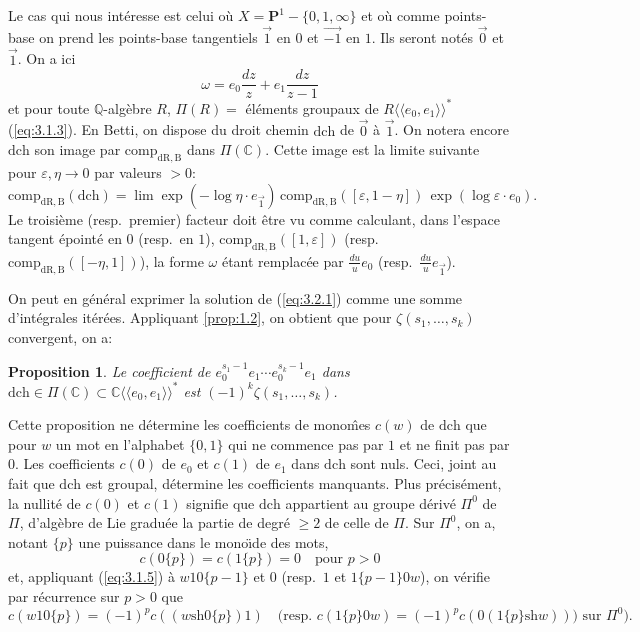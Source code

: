 \documentclass[11pt,a4paper]{article}
\theoremstyle{plain}
\newtheorem{proposition}[theorem]{Proposition}
\theoremstyle{definition}
\newcommand{\Q}{\mathbb{Q}}
\newcommand{\C}{\mathbb{C}}
\newcommand{\dR}{\mathrm{dR}}
\newcommand{\B}{\mathrm{B}}
\newcommand{\shuffle}{{\text{sh}}}
\newcommand{\comp}{\mathrm{comp}}
\begin{document}
Le cas qui nous int\'eresse est celui o\`u $X = \mathbf{P}^1 - \{0,1,\infty\}$ et o\`u comme points-base on prend les points-base tangentiels $\vec{1}$ en $0$ et $\vec{-1}$ en $1$. Ils seront not\'es $\vec{0}$ et $\vec{1}$. On a ici
\[
\omega = e_0 \frac{dz}{z} + e_1 \frac{dz}{z-1}
\]
et pour toute $\Q$-alg\`ebre $R$, $\Pi(R) =$ \'el\'ements groupaux de $R\langle\langle e_0,e_1 \rangle\rangle^*$ (\ref{eq:3.1.3}). En Betti, on dispose du droit chemin $\mathrm{dch}$ de $\vec{0}$ \`a $\vec{1}$. On notera encore $\mathrm{dch}$ son image par $\comp_{\dR,\B}$ dans $\Pi(\C)$. Cette image est la limite suivante pour $\varepsilon,\eta \to 0$ par valeurs $> 0$:
\begin{equation}\label{eq:3.4.1}
\comp_{\dR,\B}(\mathrm{dch}) = \lim \exp(-\log \eta \cdot e_{\vec{1}})\, \comp_{\dR,\B}([\varepsilon,1-\eta])\, \exp(\log \varepsilon \cdot e_0).
\end{equation}
Le troisi\`eme (resp.~premier) facteur doit \^etre vu comme calculant, dans l'espace tangent \'epoint\'e en $0$ (resp.~en $1$), $\comp_{\dR,\B}([1,\varepsilon])$ (resp.~$\comp_{\dR,\B}([-\eta,1])$), la forme $\omega$ \'etant remplac\'ee par $\frac{du}{u} e_0$ (resp.~$\frac{du}{u} e_{\vec{1}}$).

On peut en g\'en\'eral exprimer la solution de (\ref{eq:3.2.1}) comme une somme d'int\'egrales it\'er\'ees. Appliquant \ref{prop:1.2}, on obtient que pour $\zeta(s_1,\ldots,s_k)$ convergent, on a:

\begin{proposition}\label{prop:3.5}
Le coefficient de $e_0^{s_1-1} e_1 \cdots e_0^{s_k-1} e_1$ dans $\mathrm{dch} \in \Pi(\C) \subset \C\langle\langle e_0,e_1 \rangle\rangle^*$ est $(-1)^k \zeta(s_1,\ldots,s_k)$.
\end{proposition}

Cette proposition ne d\'etermine les coefficients de mono\^mes $c(w)$ de $\mathrm{dch}$ que pour $w$ un mot en l'alphabet $\{0,1\}$ qui ne commence pas par $1$ et ne finit pas par $0$. Les coefficients $c(0)$ de $e_0$ et $c(1)$ de $e_1$ dans $\mathrm{dch}$ sont nuls. Ceci, joint au fait que $\mathrm{dch}$ est groupal, d\'etermine les coefficients manquants. Plus pr\'ecis\'ement, la nullit\'e de $c(0)$ et $c(1)$ signifie que $\mathrm{dch}$ appartient au groupe d\'eriv\'e $\Pi^0$ de $\Pi$, d'alg\`ebre de Lie gradu\'ee la partie de degr\'e $\geq 2$ de celle de $\Pi$. Sur $\Pi^0$, on a, notant $\{p\}$ une puissance dans le mono\"{\i}de des mots,
\begin{equation}\label{eq:3.5.1}
c(0\{p\}) = c(1\{p\}) = 0 \quad \text{pour } p > 0
\end{equation}
et, appliquant (\ref{eq:3.1.5}) \`a $w 1 0\{p-1\}$ et $0$ (resp.~$1$ et $1\{p-1\} 0 w$), on v\'erifie par r\'ecurrence sur $p > 0$ que
\begin{equation}\label{eq:3.5.2}
c(w 1 0\{p\}) = (-1)^p c((w \shuffle 0\{p\}) 1) \quad \text{(resp. } c(1\{p\} 0 w) = (-1)^p c(0 (1\{p\} \shuffle w)) \text{) sur } \Pi^0\text{).}
\end{equation}
\end{document}
